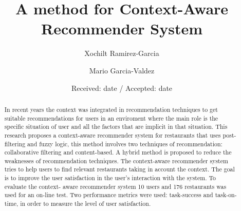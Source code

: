 \title{A method for Context-Aware Recommender System
}
\subtitle{}


\author{Xochilt Ramirez-Garcia \and Mario Garcia-Valdez %
}


\date{Received: date / Accepted: date}

\maketitle

\begin{abstract} 

In recent years the context was integrated in recommendation techniques to get
suitable recommendations for users in an enviroment where the main role is the
specific situation of user and all the factors that are implicit in that
situation. This research proposes a context-aware recommender system for
restaurants that uses post- filtering and fuzzy logic, this method involves two
techniques of recommendation: collaborative filtering and content-based. A
hybrid method is proposed to reduce the weaknesses of recommendation techniques.
The context-aware recommender system tries to help users to find relevant
restaurants taking in account the context. The goal is to improve the user
satisfaction in the user's interaction with the system. To evaluate the context-
aware recommender system 10 users and 176 restaurants was used for an on-line
test. Two performance metrics were used: task-success and task-on-time, in order
to measure the level of user satisfaction.

\end{abstract}

